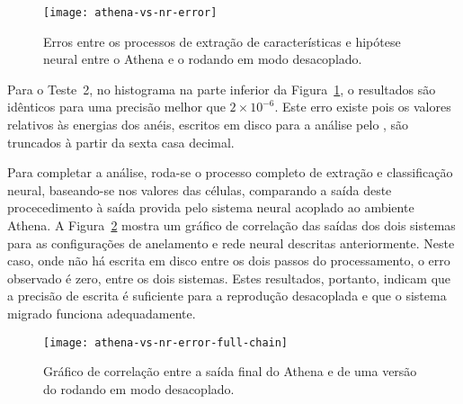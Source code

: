 \begin{figure}
\begin{center}
\texttt{[image: athena-vs-nr-error]}
\end{center}
\caption{Erros entre os processos de extração de características e hipótese
neural entre o Athena e o  rodando em modo desacoplado.}
\label{fig:athena-vs-nr}
\end{figure}

Para o Teste~2, no histograma na parte inferior da
Figura~\ref{fig:athena-vs-nr}, o resultados são idênticos para uma precisão
melhor que $2 \times 10^{-6}$. Este erro existe pois os valores relativos às
energias dos anéis, escritos em disco para a análise pelo ,
são truncados à partir da sexta casa decimal.

Para completar a análise, roda-se o processo completo de extração e
classificação neural, baseando-se nos valores das células, comparando a saída
deste procecedimento à saída provida pelo sistema neural acoplado ao ambiente
Athena. A Figura~\ref{fig:athena-vs-nr-full} mostra um gráfico de correlação
das saídas dos dois sistemas para as configurações de anelamento e rede neural
descritas anteriormente. Neste caso, onde não há escrita em disco entre os
dois passos do processamento, o erro observado é zero, entre os dois
sistemas. Estes resultados, portanto, indicam que a precisão de escrita é
suficiente para a reprodução desacoplada e que o sistema migrado funciona
adequadamente.

\begin{figure}
\begin{center}
\texttt{[image: athena-vs-nr-error-full-chain]}
\end{center}
\caption{Gráfico de correlação entre a saída final do Athena e de uma versão do
 rodando em modo desacoplado.}
\label{fig:athena-vs-nr-full}
\end{figure}

